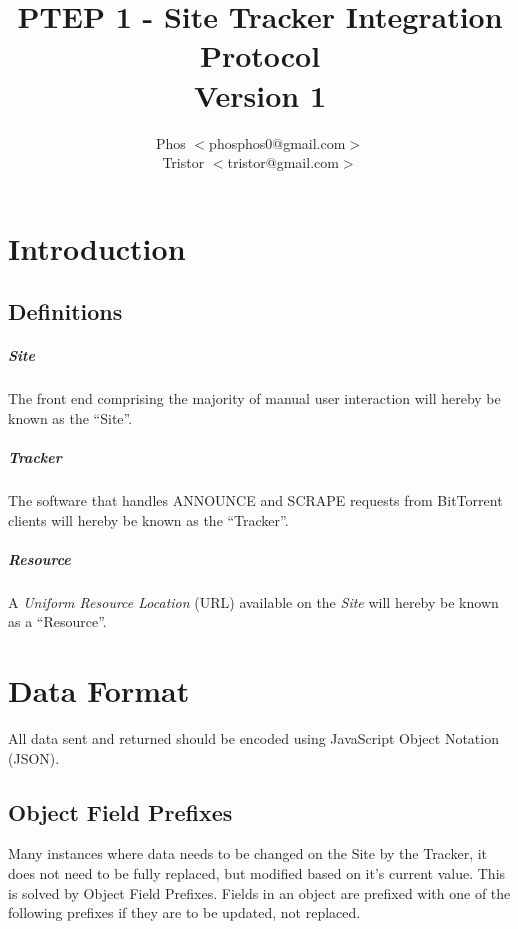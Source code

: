 \documentclass[10pt,letterpaper,titlepage]{report}
\author{
	Phos $<$phosphos0@gmail.com$>$ \\
	Tristor $<$tristor@gmail.com$>$
}
\title{
	PTEP 1 - Site Tracker Integration Protocol \\
	Version 1
}
\begin{document}
\maketitle

\tableofcontents

\chapter{Introduction}

\section{Definitions}

\paragraph{Site}

The front end comprising the majority of manual user interaction will hereby be known as the ``Site''.

\paragraph{Tracker}

The software that handles ANNOUNCE and SCRAPE requests from BitTorrent clients will hereby be known as the ``Tracker''.

\paragraph{Resource}

A \textit{Uniform Resource Location} (URL) available on the \textit{Site} will hereby be known as a ``Resource''.

\chapter{Data Format}
\label{chap:dataformat}

All data sent and returned should be encoded using JavaScript Object Notation (JSON).

\section{Object Field Prefixes}

Many instances where data needs to be changed on the Site by the Tracker, it does not need to be fully replaced, but modified based on it's current value. This is solved by Object Field Prefixes. Fields in an object are prefixed with one of the following prefixes if they are to be updated, not replaced.
\end{document}

